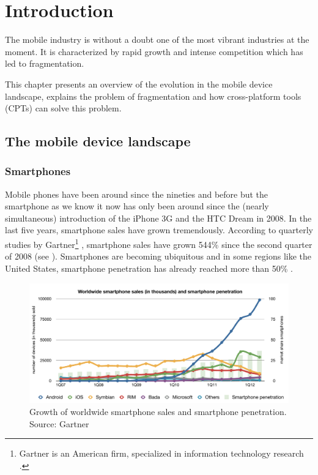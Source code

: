 \chapter{Introduction}
\label{cha:intro}


The mobile industry is without a doubt one of the most vibrant industries at the moment. It is characterized by rapid growth and intense competition which has led to fragmentation. 

This chapter presents an overview of the evolution in the mobile device landscape, explains the problem of fragmentation and how cross-platform tools (CPTs) can solve this problem.

\section{The mobile device landscape}

\subsection{Smartphones}

Mobile phones have been around since the nineties and before but the smartphone as we know it now has only been around since the (nearly simultaneous) introduction of the iPhone 3G and the HTC Dream in 2008. In the last five years, smartphone sales have grown tremendously. According to quarterly studies by Gartner\footnote{Gartner is an American firm, specialized in information technology research \cite{Gartner}.} \citeGartner, smartphone sales have grown 544\% since the second quarter of 2008 (see ). Smartphones are becoming ubiquitous and in some regions like the United States, smartphone penetration has already reached more than 50\% \cite{Nielsen:2012}. 

\begin{figure}[h!]
    \begin{center}
        \includegraphics[width=\textwidth]{figs/smartphone_sales.pdf}
        	\caption{
        	    Growth of worldwide smartphone sales and smartphone penetration.\newline
        	    Source: Gartner \citeGartner
        	}
        	\label{fig:smartphone-sales}
    \end{center}
\end{figure}


